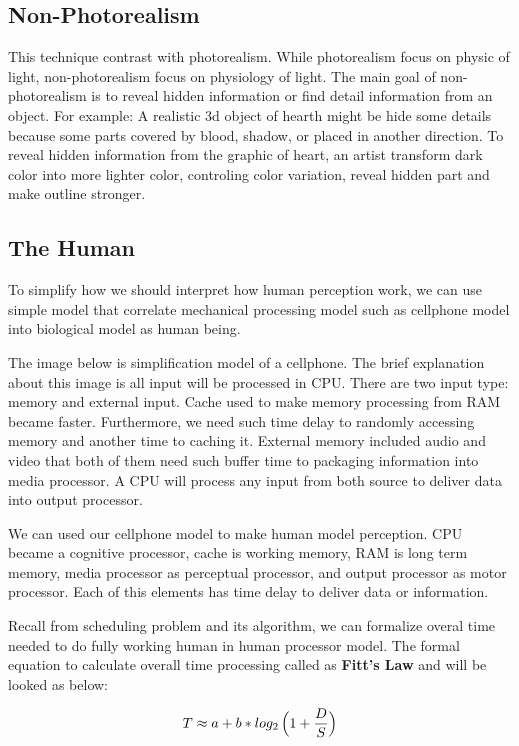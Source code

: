 \documentclass[11pt]{article}
\begin{document}
    \subsection{Non-Photorealism}\label{non-photorealism}

This technique contrast with photorealism. While photorealism focus on
physic of light, non-photorealism focus on physiology of light. The main
goal of non-photorealism is to reveal hidden information or find detail
information from an object. For example: A realistic 3d object of hearth
might be hide some details because some parts covered by blood, shadow,
or placed in another direction. To reveal hidden information from the
graphic of heart, an artist transform dark color into more lighter
color, controling color variation, reveal hidden part and make outline
stronger.

    \subsection{The Human}\label{the-human}

To simplify how we should interpret how human perception work, we can
use simple model that correlate mechanical processing model such as
cellphone model into biological model as human being.

The image below is simplification model of a cellphone. The brief
explanation about this image is all input will be processed in CPU.
There are two input type: memory and external input. Cache used to make
memory processing from RAM became faster. Furthermore, we need such time
delay to randomly accessing memory and another time to caching it.
External memory included audio and video that both of them need such
buffer time to packaging information into media processor. A CPU will
process any input from both source to deliver data into output
processor.

We can used our cellphone model to make human model perception. CPU
became a cognitive processor, cache is working memory, RAM is long term
memory, media processor as perceptual processor, and output processor as
motor processor. Each of this elements has time delay to deliver data or
information.

Recall from scheduling problem and its algorithm, we can formalize
overal time needed to do fully working human in human processor model.
The formal equation to calculate overall time processing called as
\textbf{Fitt's Law} and will be looked as below:

\[T \approx a + b * log_2\,\Big(1 + {D\over S}\Big)\]
\end{document}
